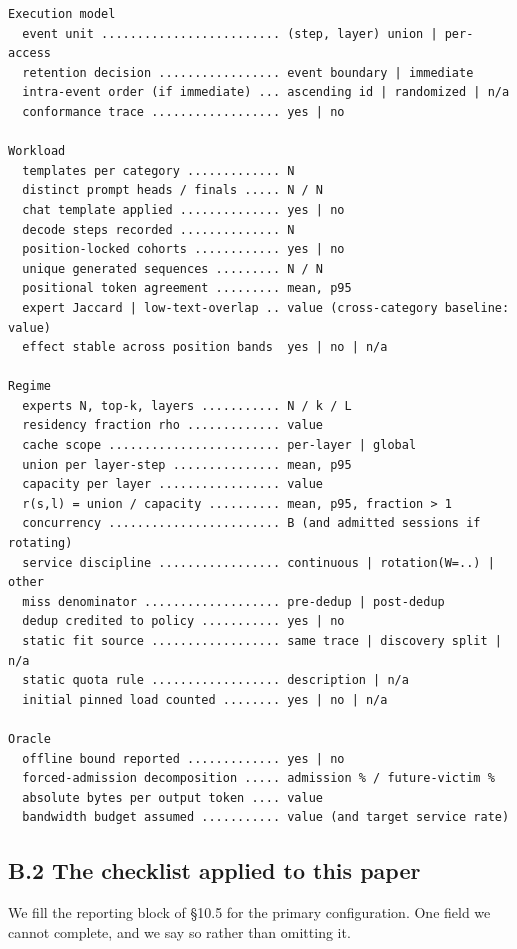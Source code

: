 \documentclass[
  10pt,
  letterpaper,
  10pt]{article}
\begin{document}
\begin{verbatim}
Execution model
  event unit ......................... (step, layer) union | per-access
  retention decision ................. event boundary | immediate
  intra-event order (if immediate) ... ascending id | randomized | n/a
  conformance trace .................. yes | no

Workload
  templates per category ............. N
  distinct prompt heads / finals ..... N / N
  chat template applied .............. yes | no
  decode steps recorded .............. N
  position-locked cohorts ............ yes | no
  unique generated sequences ......... N / N
  positional token agreement ......... mean, p95
  expert Jaccard | low-text-overlap .. value (cross-category baseline: value)
  effect stable across position bands  yes | no | n/a

Regime
  experts N, top-k, layers ........... N / k / L
  residency fraction rho ............. value
  cache scope ........................ per-layer | global
  union per layer-step ............... mean, p95
  capacity per layer ................. value
  r(s,l) = union / capacity .......... mean, p95, fraction > 1
  concurrency ........................ B (and admitted sessions if rotating)
  service discipline ................. continuous | rotation(W=..) | other
  miss denominator ................... pre-dedup | post-dedup
  dedup credited to policy ........... yes | no
  static fit source .................. same trace | discovery split | n/a
  static quota rule .................. description | n/a
  initial pinned load counted ........ yes | no | n/a

Oracle
  offline bound reported ............. yes | no
  forced-admission decomposition ..... admission % / future-victim %
  absolute bytes per output token .... value
  bandwidth budget assumed ........... value (and target service rate)
\end{verbatim}

\subsection{B.2 The checklist applied to this
paper}\label{b.2-the-checklist-applied-to-this-paper}

We fill the reporting block of §10.5 for the primary configuration. One
field we cannot complete, and we say so rather than omitting it.
\end{document}
